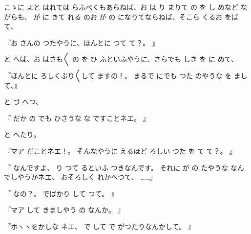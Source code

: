 
こゝに
よと
はれては
らふべくもあらねば、お
は
り
まりて
の
を
し
めなど
ながらも、
が
に
きて
れる
のお
が
の
になりてならねば、そこら
くるお
をば
て、

『お
さんの
つたやうに、ほんとに
つて
て？。
』

と
へば、お
はさも〳〵
の
を
ひ
ふといふやうに、さらでも
しき
を
に
めて、

『ほんとに
ろしくぶり〳〵して
ますの！。
まるで
にでも
つた
のやうな
を
まして、』

と
づ
へつ、

『
だか
の
でも
ひさうな
な
ですことネエ。
』

と
へたり。

『マア
だことネエ！。
そんなやうに
えるほど
ろしい
つた
を
て
て？。
』

『
なんですよ、
り
つて
るといふ
つきなんです。
それに
が
の
たやうな
なんでしやうかネエ、
おそろしく
れかへつて、
……』

『
なの？。
でばかり
して
つて。
』

『マア
して
きましやう
の
なんか。
』

『ホヽヽをかしな
ネエ、
で
して
で
がつたりなんかして。
』


